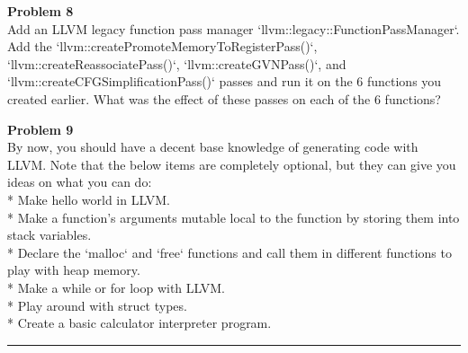 \documentclass[a4paper, 11pt]{article}
\newenvironment{problem}[2][Problem]
    { \begin{mdframed}[backgroundcolor=gray!20] \textbf{#1 #2} \\}
    {  \end{mdframed}}
\begin{document}
\begin{problem}{8}
Add an LLVM legacy function pass manager `llvm::legacy::FunctionPassManager`. Add the `llvm::createPromoteMemoryToRegisterPass()`, `llvm::createReassociatePass()`, `llvm::createGVNPass()`, and `llvm::createCFGSimplificationPass()` passes and run it on the 6 functions you created earlier. What was the effect of these passes on each of the 6 functions?

\end{problem}

\begin{problem}{9}
By now, you should have a decent base knowledge of generating code with LLVM. Note that the below items are completely optional, but they can give you ideas on what you can do: \\
* Make hello world in LLVM. \\
* Make a function's arguments mutable local to the function by storing them into stack variables. \\
* Declare the `malloc` and `free` functions and call them in different functions to play with heap memory. \\
* Make a while or for loop with LLVM. \\
* Play around with struct types. \\
* Create a basic calculator interpreter program. \\

\end{problem}

%
\noindent\rule{7in}{2.8pt}
\end{document}
